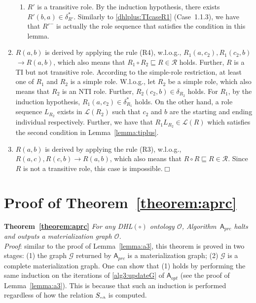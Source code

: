 \begin{enumerate}[leftmargin=12ex,label=Case~3.\arabic*, ref=Case~3.\arabic*]
\begin{enumerate}[leftmargin=8ex,label=Case~3.2.\arabic*]
     \item $R'$ is a transitive role.
        By the induction hypothesis, there exists $R'(b,a)\in\delta^*_{R'}$.
        Similarly to \ref{dhlplus:TIcaseR1} (Case~1.1.3), we have that
        $R'^-$ is actually the role sequence that satisfies the condition
        in this lemma.
    \end{enumerate}

\item $R(a,b)$ is derived by applying the rule (R4), w.l.o.g.,
    $R_1(a,c_2),R_1(c_2,b)$ $\rightarrow R(a,b)$,
    which also means that $R_1\circ R_2\sqsubseteq R\in\mathcal{R}$ holds.
    Further, $R$ is a TI but not transitive role. According to the simple-role restriction,
    at least one of $R_1$ and $R_2$ is a simple role.
    W.l.o.g., let $R_2$ be a simple role, which also
    means that $R_2$ is an NTI role. Further, $R_2(c_2,b)\in\delta_{R_2}$ holds.
    For $R_1$, by the induction hypothesis, $R_1(a,c_2)\in\delta^*_{R_1}$ holds.
    On the other hand, a role sequence $L_{R_2}$ exists in $\mathcal{L}(R_2)$ such that $c_2$ and $b$
    are the starting and ending individual respectively.
    Further, we have that $R_1L_{R_2}\in\mathcal{L}(R)$ which satisfies the second condition
    in Lemma~\ref{lemma:tiplus}.\label{dhlplus:TIcaseR4}

\item $R(a,b)$ is derived by applying the rule (R3), w.l.o.g., $R(a,c),R(c,b)\rightarrow R(a,b)$,
    which also means that $R\circ R\sqsubseteq R\in\mathcal{R}$.
    Since $R$ is not a transitive role, this case is impossible.\hfill$\Box$
\end{enumerate}

\section{Proof of Theorem~\ref{theorem:aprc}}

\textbf{Theorem~\ref{theorem:aprc}}
\emph{For any DHL$(\circ)$ ontology $\mathcal{O}$, Algorithm~$\mathsf{A}_{prc}$ halts and outputs
a materialization graph $\mathcal{O}$.}\\

\noindent\emph{Proof}: similar to the proof of Lemma~\ref{lemma:a3},
this theorem is proved in two stages:
(1) the graph $\mathcal{G}$ returned by $\mathsf{A}_{prc}$ is a materialization graph;
(2) $\mathcal{G}$ is a complete materialization graph.
One can show that (1) holds by performing the same induction on the iterations of \ref{alg3:updateG} of $\mathsf{A}_{opt}$
(see the proof of Lemma~\ref{lemma:a3}). This is because that
such an induction is performed regardless of how the relation $S_{\textit{\tiny rch}}$ is computed.

